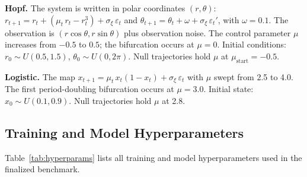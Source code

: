 \textbf{Hopf.} The system is written in polar coordinates $(r, \theta)$:
$r_{t+1} = r_t + (\mu_t\,r_t - r_t^3) + \sigma_\xi\,\varepsilon_t$ and
$\theta_{t+1} = \theta_t + \omega + \sigma_\xi\,\varepsilon_t'$, with
$\omega = 0.1$. The observation is $(r\cos\theta, r\sin\theta)$ plus
observation noise. The control parameter $\mu$ increases from $-0.5$ to $0.5$;
the bifurcation occurs at $\mu = 0$. Initial conditions:
$r_0 \sim U(0.5, 1.5)$, $\theta_0 \sim U(0, 2\pi)$. Null trajectories hold
$\mu$ at $\mu_{\mathrm{start}} = -0.5$.

\textbf{Logistic.} The map $x_{t+1} = \mu_t\,x_t(1 - x_t) +
\sigma_\xi\,\varepsilon_t$ with $\mu$ swept from 2.5 to 4.0. The first
period-doubling bifurcation occurs at $\mu = 3.0$. Initial state:
$x_0 \sim U(0.1, 0.9)$. Null trajectories hold $\mu$ at 2.8.

\subsection{Training and Model Hyperparameters}
\label{sec:appendix:hyperparams}

Table~\ref{tab:hyperparams} lists all training and model hyperparameters used
in the finalized benchmark.

